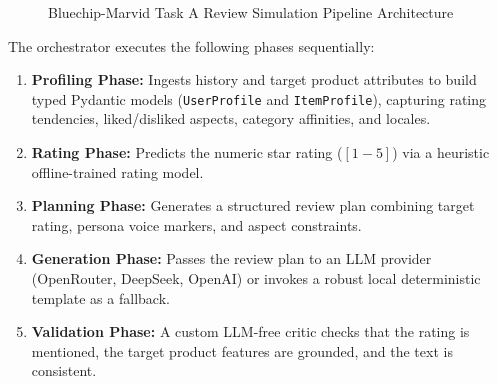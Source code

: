\documentclass[11pt,a4paper]{article}
\begin{document}
\begin{figure}[h!]
\centering
{}
\caption{Bluechip-Marvid Task A Review Simulation Pipeline Architecture}
\label{fig:architecture}
\end{figure}

The orchestrator executes the following phases sequentially:
\begin{enumerate}
    \item \textbf{Profiling Phase:} Ingests history and target product attributes to build typed Pydantic models (\texttt{UserProfile} and \texttt{ItemProfile}), capturing rating tendencies, liked/disliked aspects, category affinities, and locales.
    \item \textbf{Rating Phase:} Predicts the numeric star rating ($[1-5]$) via a heuristic offline-trained rating model.
    \item \textbf{Planning Phase:} Generates a structured review plan combining target rating, persona voice markers, and aspect constraints.
    \item \textbf{Generation Phase:} Passes the review plan to an LLM provider (OpenRouter, DeepSeek, OpenAI) or invokes a robust local deterministic template as a fallback.
    \item \textbf{Validation Phase:} A custom LLM-free critic checks that the rating is mentioned, the target product features are grounded, and the text is consistent.
\end{enumerate}
\end{document}

